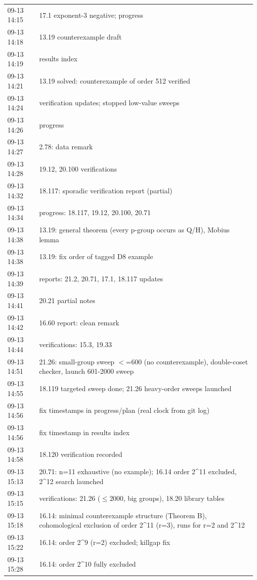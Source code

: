 \begin{longtable}{lp{12.5cm}}
09-13 14:15 & 17.1 exponent-3 negative; progress \\
09-13 14:18 & 13.19 counterexample draft \\
09-13 14:19 & results index \\
09-13 14:21 & 13.19 solved: counterexample of order 512 verified \\
09-13 14:24 & verification updates; stopped low-value sweeps \\
09-13 14:26 & progress \\
09-13 14:27 & 2.78: data remark \\
09-13 14:28 & 19.12, 20.100 verifications \\
09-13 14:32 & 18.117: sporadic verification report (partial) \\
09-13 14:34 & progress: 18.117, 19.12, 20.100, 20.71 \\
09-13 14:38 & 13.19: general theorem (every p-group occurs as Q/H), Mobius lemma \\
09-13 14:38 & 13.19: fix order of tagged D8 example \\
09-13 14:39 & reports: 21.2, 20.71, 17.1, 18.117 updates \\
09-13 14:41 & 20.21 partial notes \\
09-13 14:42 & 16.60 report: clean remark \\
09-13 14:44 & verifications: 15.3, 19.33 \\
09-13 14:51 & 21.26: small-group sweep $<$=600 (no counterexample), double-coset checker, launch 601-2000 sweep \\
09-13 14:55 & 18.119 targeted sweep done; 21.26 heavy-order sweeps launched \\
09-13 14:56 & fix timestamps in progress/plan (real clock from git log) \\
09-13 14:56 & fix timestamp in results index \\
09-13 14:58 & 18.120 verification recorded \\
09-13 15:13 & 20.71: n=11 exhaustive (no example); 16.14 order 2\^{}11 excluded, 2\^{}12 search launched \\
09-13 15:15 & verifications: 21.26 ($\le$2000, big groups), 18.20 library tables \\
09-13 15:18 & 16.14: minimal counterexample structure (Theorem B), cohomological exclusion of order 2\^{}11 (r=3), runs for r=2 and 2\^{}12 \\
09-13 15:22 & 16.14: order 2\^{}9 (r=2) excluded; killgap fix \\
09-13 15:28 & 16.14: order 2\^{}10 fully excluded \\

\end{longtable}
